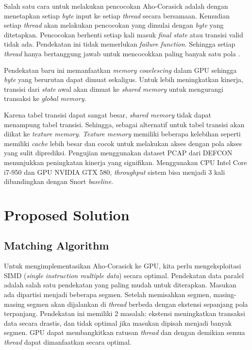 \documentclass[conference]{IEEEtran}
\begin{document}
        Salah satu cara untuk melakukan pencocokan Aho-Corasick adalah dengan menetapkan setiap \emph{byte} input ke setiap \emph{thread} secara bersamaan. Kemudian setiap \emph{thread} akan melakukan pencocokan yang dimulai dengan \emph{byte} yang ditetapkan. Pencocokan berhenti setiap kali masuk \emph{final state} atau transisi valid tidak ada. Pendekatan ini tidak memerlukan \emph{failure function}. Sehingga setiap \emph{thread} hanya bertanggung jawab untuk mencocokkan paling banyak satu pola \cite{lin2013}.
        
        Pendekatan baru ini memanfaatkan \emph{memory coaelescing} dalam GPU sehingga \emph{byte} yang berurutan dapat dimuat sekaligus. Untuk lebih meningkatkan kinerja, transisi dari \emph{state} awal akan dimuat ke \emph{shared memory} untuk mengurangi transaksi ke \emph{global memory}.
        
        Karena tabel transisi dapat sangat besar, \emph{shared memory} tidak dapat menampung tabel transisi. Sehingga, sebagai alternatif untuk tabel transisi akan diikat ke \emph{texture memory}. \emph{Texture memory} memiliki beberapa kelebihan seperti memiliki \emph{cache} lebih besar dan cocok untuk melakukan akses dengan pola akses yang sulit diprediksi. Pengujian menggunakan dataset PCAP dari DEFCON menunjukkan peningkatan kinerja yang signifikan. Menggunakan CPU Intel Core i7-950 dan GPU NVIDIA GTX 580, \emph{throughput} sistem bisa menjadi 3 kali dibandingkan dengan Snort \emph{baseline}.

\section{Proposed Solution}
    \subsection{Matching Algorithm}
        Untuk mengimplementasikan Aho-Corasick ke GPU, kita perlu mengeksploitasi SIMD (\emph{single instruction multiple data}) secara optimal. Pendekatan data paralel adalah salah satu pendekatan yang paling mudah untuk diterapkan. Masukan ada dipartisi menjadi beberapa segmen. Setelah memisahkan segmen, masing-masing segmen akan dijalankan di \emph{thread} berbeda dengan ekstensi sepanjang pola terpanjang. Pendekatan ini memiliki 2 masalah: ekstensi meningkatkan transaksi data secara drastis, dan tidak optimal jika masukan dipisah menjadi banyak segmen. GPU dapat membangkitkan ratusan \emph{thread} dan dengan demikian semua \emph{thread} dapat dimanfaatkan secara optimal.
        
\end{document}
